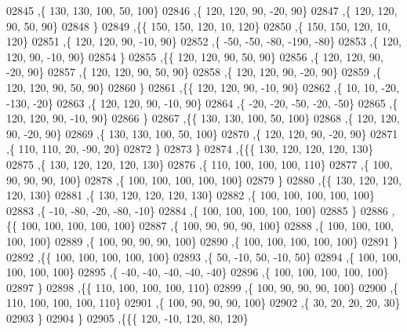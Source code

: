 \begin{DoxyCode}
02845     ,\{   130,   130,   100,    50,   100\}
02846     ,\{   120,   120,    90,   -20,    90\}
02847     ,\{   120,   120,    90,    50,    90\}
02848     \}
02849    ,\{\{   150,   150,   120,    10,   120\}
02850     ,\{   150,   150,   120,    10,   120\}
02851     ,\{   120,   120,    90,   -10,    90\}
02852     ,\{   -50,   -50,   -80,  -190,   -80\}
02853     ,\{   120,   120,    90,   -10,    90\}
02854     \}
02855    ,\{\{   120,   120,    90,    50,    90\}
02856     ,\{   120,   120,    90,   -20,    90\}
02857     ,\{   120,   120,    90,    50,    90\}
02858     ,\{   120,   120,    90,   -20,    90\}
02859     ,\{   120,   120,    90,    50,    90\}
02860     \}
02861    ,\{\{   120,   120,    90,   -10,    90\}
02862     ,\{    10,    10,   -20,  -130,   -20\}
02863     ,\{   120,   120,    90,   -10,    90\}
02864     ,\{   -20,   -20,   -50,   -20,   -50\}
02865     ,\{   120,   120,    90,   -10,    90\}
02866     \}
02867    ,\{\{   130,   130,   100,    50,   100\}
02868     ,\{   120,   120,    90,   -20,    90\}
02869     ,\{   130,   130,   100,    50,   100\}
02870     ,\{   120,   120,    90,   -20,    90\}
02871     ,\{   110,   110,    20,   -90,    20\}
02872     \}
02873    \}
02874   ,\{\{\{   130,   120,   120,   120,   130\}
02875     ,\{   130,   120,   120,   120,   130\}
02876     ,\{   110,   100,   100,   100,   110\}
02877     ,\{   100,    90,    90,    90,   100\}
02878     ,\{   100,   100,   100,   100,   100\}
02879     \}
02880    ,\{\{   130,   120,   120,   120,   130\}
02881     ,\{   130,   120,   120,   120,   130\}
02882     ,\{   100,   100,   100,   100,   100\}
02883     ,\{   -10,   -80,   -20,   -80,   -10\}
02884     ,\{   100,   100,   100,   100,   100\}
02885     \}
02886    ,\{\{   100,   100,   100,   100,   100\}
02887     ,\{   100,    90,    90,    90,   100\}
02888     ,\{   100,   100,   100,   100,   100\}
02889     ,\{   100,    90,    90,    90,   100\}
02890     ,\{   100,   100,   100,   100,   100\}
02891     \}
02892    ,\{\{   100,   100,   100,   100,   100\}
02893     ,\{    50,   -10,    50,   -10,    50\}
02894     ,\{   100,   100,   100,   100,   100\}
02895     ,\{   -40,   -40,   -40,   -40,   -40\}
02896     ,\{   100,   100,   100,   100,   100\}
02897     \}
02898    ,\{\{   110,   100,   100,   100,   110\}
02899     ,\{   100,    90,    90,    90,   100\}
02900     ,\{   110,   100,   100,   100,   110\}
02901     ,\{   100,    90,    90,    90,   100\}
02902     ,\{    30,    20,    20,    20,    30\}
02903     \}
02904    \}
02905   ,\{\{\{   120,   -10,   120,    80,   120\}

\end{DoxyCode}
